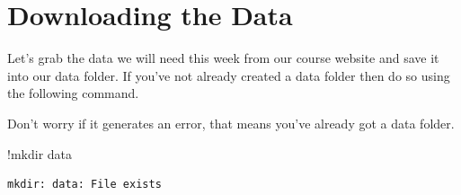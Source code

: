 \documentclass[
  letterpaper,
  DIV=11,
  numbers=noendperiod]{scrreprt}
\newenvironment{Shaded}{\begin{snugshade}}{\end{snugshade}}
\newcommand{\NormalTok}[1]{\textcolor[rgb]{0.00,0.23,0.31}{#1}}
\newcommand{\OperatorTok}[1]{\textcolor[rgb]{0.37,0.37,0.37}{#1}}
\begin{document}
\hypertarget{downloading-the-data-4}{%
\section{Downloading the Data}\label{downloading-the-data-4}}

Let's grab the data we will need this week from our course website and
save it into our data folder. If you've not already created a data
folder then do so using the following command.

Don't worry if it generates an error, that means you've already got a
data folder.

\begin{Shaded}
\begin{Highlighting}[]
\OperatorTok{!}\NormalTok{mkdir data}
\end{Highlighting}
\end{Shaded}

\begin{verbatim}
mkdir: data: File exists
\end{verbatim}
\end{document}
